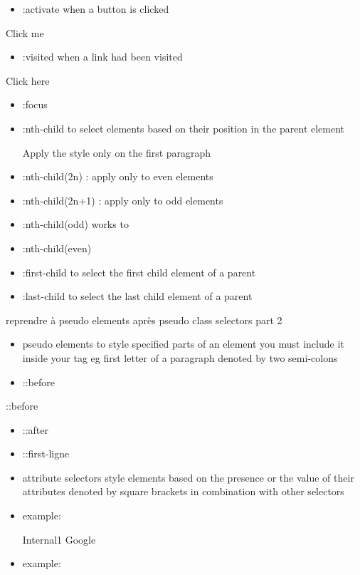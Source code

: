 \documentclass[
]{book}
\providecommand{\tightlist}{%
  \setlength{\itemsep}{0pt}\setlength{\parskip}{0pt}}
\begin{document}
\begin{itemize}
\tightlist
\item
  :activate
  when a button is clicked
\end{itemize}

Click me

\begin{itemize}
\tightlist
\item
  :visited
  when a link had been visited
\end{itemize}

Click here

\begin{itemize}
\tightlist
\item
  :focus
\end{itemize}

\begin{itemize}
\item
  :nth-child
  to select elements based on their position in the parent element

  Apply the style only on the first paragraph
\item
  :nth-child(2n) : apply only to even elements
\item
  :nth-child(2n+1) : apply only to odd elements
\item
  :nth-child(odd) works to
\item
  :nth-child(even)
\item
  :first-child
  to select the first child element of a parent
\item
  :last-child
  to select the last child element of a parent
\end{itemize}

reprendre à pseudo elements après pseudo class selectors part 2

\begin{itemize}
\item
  pseudo elements
  to style specified parts of an element
  you must include it inside your tag
  eg first letter of a paragraph
  denoted by two semi-colons
\item
  ::before
\end{itemize}

::before

\begin{itemize}
\item
  ::after
\item
  ::first-ligne
\item
  attribute selectors
  style elements based on the presence or the value of their attributes
  denoted by square brackets
  in combination with other selectors
\item
  example:

  Internal1
  Google
\item
  example:
\end{itemize}
\end{document}
